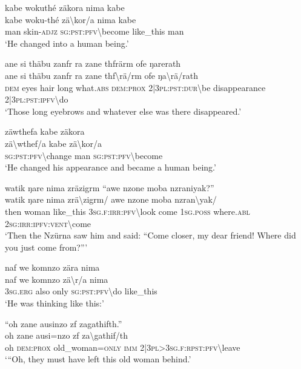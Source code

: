 \ea\label{ex:7:a4724}
kabe wokuthé zäkora nima kabe\\
\gll kabe	woku-thé	zä{\textbackslash}kor/a	nima	kabe\\
     man	skin-\textsc{adjz}	\textsc{sg}:\textsc{pst}:\textsc{pfv}{\textbackslash}become	like\_this	man\\
\glt `He changed into a human being.'
\z

\newpage
\ea\label{ex:7:a4725}
ane si thäbu zanfr ra zane thfrärm ofe ŋarerath\\
\gll ane	si	thäbu	zanfr	ra	zane	thf{\textbackslash}rä/rm	ofe	ŋa{\textbackslash}rä/rath\\
     \textsc{dem}	eyes	hair	long	what.\textsc{abs}	\textsc{dem}:\textsc{prox}	2|3\textsc{pl}:\textsc{pst}:\textsc{dur}{\textbackslash}be	disappearance	2|3\textsc{pl}:\textsc{pst}:\textsc{ipfv}{\textbackslash}do\\
\glt `Those long eyebrows and whatever else was there disappeared.'
\z

\ea\label{ex:7:a4727}
zäwthefa kabe zäkora\\
\gll zä{\textbackslash}wthef/a	kabe	zä{\textbackslash}kor/a\\
     \textsc{sg}:\textsc{pst}:\textsc{pfv}{\textbackslash}change	man	\textsc{sg}:\textsc{pst}:\textsc{pfv}{\textbackslash}become\\
\glt `He changed his appearance and became a human being.'
\z

\ea\label{ex:7:a4729}
watik ŋare nima zräzigrm ``awe nzone moba nzraniyak?''\\
\gll watik	ŋare	nima	zrä{\textbackslash}zigrm/	awe	nzone	moba	nzran{\textbackslash}yak/\\
     then	woman	like\_this	3\textsc{sg}.\textsc{f}:\textsc{irr}:\textsc{pfv}{\textbackslash}look	come	1\textsc{sg}.\textsc{poss}	where.\textsc{abl}	2\textsc{sg}:\textsc{irr}:\textsc{ipfv}:\textsc{vent}{\textbackslash}come\\
\glt `Then the Nzürna saw him and said: ``Come closer, my dear friend! Where did you just come from?'''
\z

\ea\label{ex:7:a4731}
naf we komnzo zära nima\\
\gll naf	we	komnzo	zä{\textbackslash}r/a	nima\\
     3\textsc{sg}.\textsc{erg}	also	only	\textsc{sg}:\textsc{pst}:\textsc{pfv}{\textbackslash}do	like\_this\\
\glt `He was thinking like this:'
\z

\ea\label{ex:7:a4732}
``oh zane ausinzo zf zagathifth.''\\
\gll oh	zane	ausi=nzo	zf	za{\textbackslash}gathif/th\\
     oh	\textsc{dem}:\textsc{prox}	old\_woman=\textsc{only}	\textsc{imm}	2|3\textsc{pl}>3\textsc{sg}.\textsc{f}:\textsc{rpst}:\textsc{pfv}{\textbackslash}leave\\
\glt `{``}Oh, they must have left this old woman behind.'
\z

